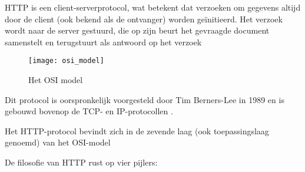 HTTP is een client-serverprotocol, wat betekent dat verzoeken om gegevens altijd door de client (ook bekend als de ontvanger) worden geïnitieerd. Het verzoek wordt naar de server gestuurd, die op zijn beurt het gevraagde document samenstelt en terugstuurt als antwoord op het verzoek \autocite{MDN2023}

\begin{figure}[H]
    \texttt{[image: osi\_model]}
    \centering
    \caption[Het OSI model]{Het OSI model \autocite{ByteByteGo2022}}
    \label{fig:osiModel}
\end{figure}

Dit protocol is oorspronkelijk voorgesteld door Tim Berners-Lee in 1989 en is gebouwd bovenop de TCP- en IP-protocollen \autocite{MDN2023a}.

Het HTTP-protocol bevindt zich in de zevende laag (ook toepassingslaag genoemd) van het OSI-model \autocite{MDN2023}

De filosofie van HTTP rust op vier pijlers:\\


